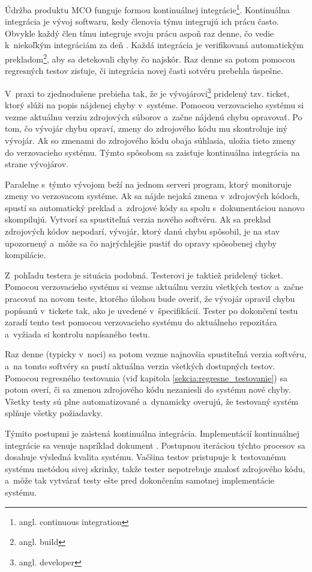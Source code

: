 Údržba produktu MCO funguje formou kontinuálnej integrácie\footnote{angl. continuous integration}.
Kontinuálna integrácia je vývoj softwaru, kedy členovia týmu integrujú
ich prácu často. Obvykle každý člen tímu integruje svoju prácu aspoň 
raz denne, čo vedie k~niekoľkým integráciám za deň \cite{Continuous_integration}.
Každá integrácia je verifikovaná automatickým prekladom\footnote{angl. build}, aby sa detekovali 
chyby čo najskôr. Raz denne sa potom pomocou regresných testov zisťuje,
či integrácia novej časti sotvéru prebehla úspešne.

V~praxi to zjednodušene prebieha tak, že je vývojárovi\footnote{angl. developer}
pridelený tzv. ticket, ktorý slúži na popis nájdenej chyby v~systéme. 
Pomocou verzovacieho systému si vezme aktuálnu verziu zdrojových súborov 
a~začne nájdenú chybu opravovať.
Po tom, čo vývojár chybu opraví, zmeny do zdrojového kódu mu skontroluje 
iný vývojár. Ak so zmenami do zdrojového kódu obaja súhlasia, uložia 
tieto zmeny do verzovacieho systému. Týmto spôsobom sa zaisťuje 
kontinuálna integrácia na strane vývojárov.

Paralelne s~týmto vývojom beží na jednom serveri program, ktorý 
monitoruje zmeny vo verzovacom systéme. Ak sa nájde nejaká zmena 
v~zdrojových kódoch, spustí sa automatický preklad a~zdrojové kódy sa 
spolu s~dokumentáciou nanovo skompilujú. Vytvorí sa spustiteľná verzia 
nového softvéru. Ak sa preklad zdrojových kódov nepodarí, vývojár, ktorý 
danú chybu spôsobil, je na stav upozornený a~môže sa čo najrýchlejšie 
pustiť do opravy spôsobenej chyby kompilácie.

Z~pohľadu testera je situácia podobná. Testerovi je taktiež pridelený 
ticket. Pomocou verzovacieho systému si vezme aktuálnu verziu
všetkých testov a~začne pracovať na novom teste, ktorého úlohou bude overiť, že vývojár 
opravil chybu popísanú v~tickete tak, ako je uvedené v~špecifikácií.
Tester po dokončení testu zaradí tento test pomocou verzovacieho 
systému do aktuálneho repozitára a~vyžiada si kontrolu napísaného testu. 

Raz denne (typicky v~noci) sa potom vezme najnovšia spustiteľná verzia 
softvéru, a~na tomto softvéry sa pustí aktuálna verzia všetkých dostupných 
testov. Pomocou regresného testovania 
(viď kapitola \ref{sekcia:regresne_testovanie}) sa potom overí, či sa 
zmenou zdrojového kódu nezaniesli do systému nové chyby. 
Všetky testy sú plne automatizované a~dynamicky overujú, že testovaný 
systém splňuje všetky požiadavky.

Týmito postupmi je zaistená kontinuálna integrácia. 
Implementácií kontinuálnej integrácie sa venuje napríklad dokument 
\cite{Continuous_integration_implementation}. 
Postupnou iteráciou týchto procesov sa dosahuje výsledná kvalita systému. 
Vačšina testov pristupuje k~testovanému systému metódou sivej skrinky, 
takže tester nepotrebuje znalosť zdrojového kódu, a~môže tak vytvárať 
testy ešte pred dokončením samotnej implementácie systému. 

